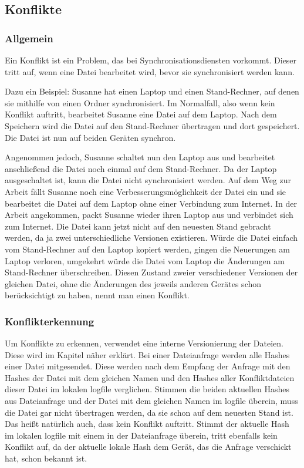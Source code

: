 \subsection{Konflikte}\label{Konflikt}
\subsubsection{Allgemein}
Ein Konflikt ist ein Problem, das bei Synchronisationsdiensten vorkommt. Dieser tritt auf, wenn eine Datei bearbeitet wird, bevor sie synchronisiert werden kann. 

Dazu ein Beispiel: Susanne hat einen Laptop und einen Stand-Rechner, auf denen sie mithilfe von \sblit einen Ordner synchronisiert. Im Normalfall, also wenn kein Konflikt auftritt, bearbeitet Susanne eine Datei auf dem Laptop. Nach dem Speichern wird die Datei auf den Stand-Rechner übertragen und dort gespeichert. Die Datei ist nun auf beiden Geräten synchron.

Angenommen jedoch, Susanne schaltet nun den Laptop aus und bearbeitet anschließend die Datei noch einmal auf dem Stand-Rechner. Da der Laptop ausgeschaltet ist, kann die Datei nicht synchronisiert werden. Auf dem Weg zur Arbeit fällt Susanne noch eine Verbesserungsmöglichkeit der Datei ein und sie bearbeitet die Datei auf dem Laptop ohne einer Verbindung zum Internet. In der Arbeit angekommen, packt Susanne wieder ihren Laptop aus und verbindet sich zum Internet. Die Datei kann jetzt nicht auf den neuesten Stand gebracht werden, da ja zwei unterschiedliche Versionen existieren. Würde die Datei einfach vom Stand-Rechner auf den Laptop kopiert werden, gingen die Neuerungen am Laptop verloren, umgekehrt würde die Datei vom Laptop die Änderungen am Stand-Rechner überschreiben. Diesen Zustand zweier verschiedener Versionen der gleichen Datei, ohne die Änderungen des jeweils anderen Gerätes schon berücksichtigt zu haben, nennt man einen Konflikt.

\subsubsection{Konflikterkennung}\label{Konflikterkennung}
Um Konflikte zu erkennen, verwendet \sblit eine interne Versionierung der Dateien. Diese wird im Kapitel  näher erklärt. Bei einer Dateianfrage  werden alle Hashes einer Datei mitgesendet. Diese werden nach dem Empfang der Anfrage mit den Hashes der Datei mit dem gleichen Namen und den Hashes aller Konfliktdateien dieser Datei im lokalen \gls{logfile} verglichen. Stimmen die beiden aktuellen Hashes aus Dateianfrage und der Datei mit dem gleichen Namen im \gls{logfile} überein, muss die Datei gar nicht übertragen werden, da sie schon auf dem neuesten Stand ist. Das heißt natürlich auch, dass kein Konflikt auftritt. Stimmt der aktuelle Hash im lokalen \gls{logfile} mit einem in der Dateianfrage überein, tritt ebenfalls kein Konflikt auf, da der aktuelle lokale Hash dem Gerät, das die Anfrage verschickt hat, schon bekannt ist. 

